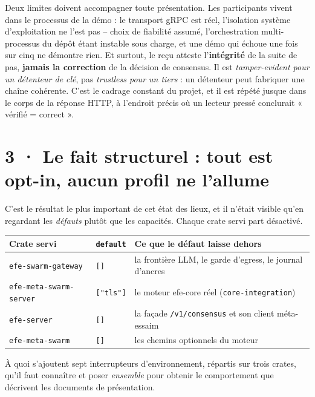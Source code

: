 \documentclass[10pt]{article}
\newcommand{\code}[1]{\texttt{\small #1}}
\begin{document}
Deux limites doivent accompagner toute présentation. Les participants vivent dans le processus de la
démo : le transport gRPC est réel, l'isolation système d'exploitation ne l'est pas -- choix de
fiabilité assumé, l'orchestration multi-processus du dépôt étant instable sous charge, et une démo qui
échoue une fois sur cinq ne démontre rien. Et surtout, le reçu atteste l'\textbf{intégrité} de la
suite de pas, \textbf{jamais la correction} de la décision de consensus. Il est \emph{tamper-evident
pour un détenteur de clé}, pas \emph{trustless pour un tiers} : un détenteur peut fabriquer une chaîne
cohérente. C'est le cadrage constant du projet, et il est répété jusque dans le corps de la réponse
HTTP, à l'endroit précis où un lecteur pressé conclurait « vérifié = correct ».

\section{3 · Le fait structurel : tout est opt-in, aucun profil ne l'allume}

C'est le résultat le plus important de cet état des lieux, et il n'était visible qu'en regardant les
\emph{défauts} plutôt que les capacités. Chaque crate servi part désactivé.

\renewcommand{\arraystretch}{1.1}
\begin{center}\small
\begin{tabular}{@{}l l >{\raggedright\arraybackslash}p{9.3cm}@{}}
\toprule
\textbf{Crate servi} & \textbf{\code{default}} & \textbf{Ce que le défaut laisse dehors} \\
\midrule
\code{efe-swarm-gateway}     & \code{[]}      & la frontière LLM, le garde d'egress, le journal d'ancres \\
\code{efe-meta-swarm-server} & \code{["tls"]} & le moteur efe-core réel (\code{core-integration}) \\
\code{efe-server}            & \code{[]}      & la façade \code{/v1/consensus} et son client méta-essaim \\
\code{efe-meta-swarm}        & \code{[]}      & les chemins optionnels du moteur \\
\bottomrule
\end{tabular}
\end{center}

À quoi s'ajoutent sept interrupteurs d'environnement, répartis sur trois crates, qu'il faut connaître
et poser \emph{ensemble} pour obtenir le comportement que décrivent les documents de présentation.
\end{document}

